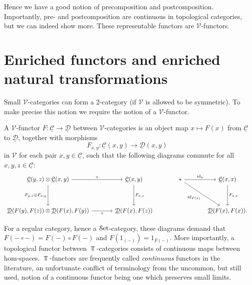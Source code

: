 Hence we have a good notion of precomposition and postcomposition. Importantly, pre- and postcomposition are continuous in topological categories, but we can indeed show more. These representable functors are $\mathcal{V} $-functors.

\section{Enriched functors and enriched natural transformations}

Small $\mathcal{V} $-categories can form a 2-category (if $\mathcal{V} $ is allowed to be symmetric). To make precise this notion we require the notion of a $\mathcal{V} $-functor.

\begin{definition}\label{dfn:3.5}
	A $\mathcal{V} $-functor $F : \underline{\mathcal{C} }  \to \underline{\mathcal{D} } $ between $\mathcal{V} $-categories is an object map $x\mapsto F(x)$ from $\underline{\mathcal{C} } $ to $\underline{\mathcal{D} } $, together with morphisms
	\[
		F_{x,y} : \underline{\mathcal{C} } (x,y) \to \underline{\mathcal{D} } (x,y)
	\]
	in $\mathcal{V} $ for each pair $x,y\in \underline{\mathcal{C} } $, such that the following diagrams commute for all $x,y,z\in \underline{\mathcal{C} } $:
	\[\begin{tikzcd}[row sep = 3.5em, column sep = 3.5em]
	\underline{\mathcal{C} } (y,z)\otimes \underline{\mathcal{C} } (x,y)\ar[" \circ  ", r] \ar[" F_{y\text{,} z} \otimes F_{x\text{,} y}  "', d]  & \underline{\mathcal{C} } (x,y)\ar[" F_{x\text{,} z}  ", d]  & *\ar[" \mathrm{id} _x ", r] \ar[" \mathrm{id} _{F(x)}  "', dr]  & \underline{\mathcal{C} } (x,x)\ar[" F_{x\text{,} x}  ", d] \\
	\underline{\mathcal{D} } (F(y),F(z))\otimes \underline{\mathcal{D} } (F(x),F(y))\ar[" \circ  "', r]  & \underline{\mathcal{D} } (F(x),F(z)) &  & \underline{\mathcal{D} } (F(x),F(x)).
	\end{tikzcd}\]
\end{definition}

For a regular category, hence a $\mathcal{S}\mathrm{et} $-category, these diagrams demand that $F(-\circ -)=F(-)\circ F(-)$ and $F(1_{(-)} )=1_{F(-)} $. More importantly, a topological functor between $\Top $-categories consists of continuous maps between hom-spaces. $\Top $-functors are frequently called \emph{continuous} functors in the literature, an unfortunate conflict of terminology from the uncommon, but still used, notion of a continuous functor being one which preserves small limits.

